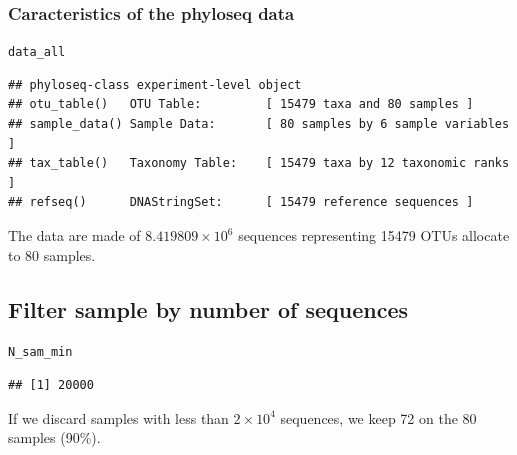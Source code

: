 \documentclass[12pt]{article}\usepackage[]{graphicx}\usepackage[]{color}
\makeatletter
\newcommand{\hlstd}[1]{\textcolor[rgb]{0.345,0.345,0.345}{#1}}%
\newenvironment{kframe}{%
 \def\at@end@of@kframe{}%
 \ifinner\ifhmode%
  \def\at@end@of@kframe{\end{minipage}}%
  \begin{minipage}{\columnwidth}%
 \fi\fi%
 \def\FrameCommand##1{\hskip\@totalleftmargin \hskip-\fboxsep
 \colorbox{shadecolor}{##1}\hskip-\fboxsep
     \hskip-\linewidth \hskip-\@totalleftmargin \hskip\columnwidth}%
 \MakeFramed {\advance\hsize-\width
   \@totalleftmargin\z@ \linewidth\hsize
   \@setminipage}}%
 {\par\unskip\endMakeFramed%
 \at@end@of@kframe}
\newenvironment{knitrout}{}{} %
\numberwithin{figure}{section}
\makeatother
\begin{document}
\subsubsection{Caracteristics of the phyloseq data}

\begin{knitrout}\small
{}\color{fgcolor}\begin{kframe}
\begin{alltt}
\hlstd{data_all}
\end{alltt}
\begin{verbatim}
## phyloseq-class experiment-level object
## otu_table()   OTU Table:         [ 15479 taxa and 80 samples ]
## sample_data() Sample Data:       [ 80 samples by 6 sample variables ]
## tax_table()   Taxonomy Table:    [ 15479 taxa by 12 taxonomic ranks ]
## refseq()      DNAStringSet:      [ 15479 reference sequences ]
\end{verbatim}
\end{kframe}
\end{knitrout}

The data are made of \ensuremath{8.419809\times 10^{6}} sequences representing 15479 OTUs allocate to 80 samples.

  \subsection{Filter sample by number of sequences}

\begin{knitrout}\small
{}\color{fgcolor}\begin{kframe}
\begin{alltt}
\hlstd{N_sam_min}
\end{alltt}
\begin{verbatim}
## [1] 20000
\end{verbatim}
\end{kframe}
\end{knitrout}

If we discard samples with less than \ensuremath{2\times 10^{4}} sequences, we keep 72 on the 80 samples (90\%).
\end{document}
